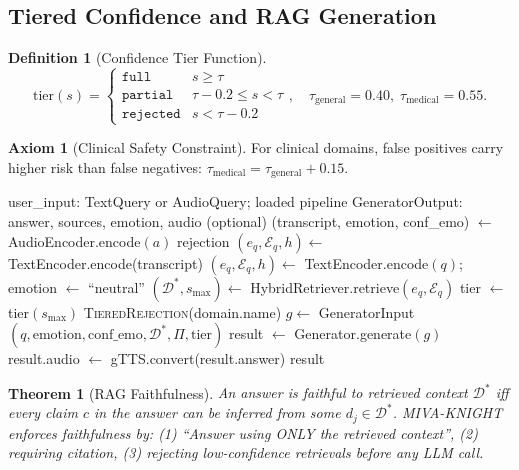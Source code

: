 \documentclass[12pt,a4paper]{article}
\theoremstyle{definition}
\newtheorem{definition}{Definition}[section]
\newtheorem{axiom}{Axiom}[section]
\theoremstyle{plain}
\newtheorem{theorem}{Theorem}[section]
\theoremstyle{remark}
\begin{document}
\subsection{Tiered Confidence and RAG Generation}

\begin{definition}[Confidence Tier Function]
\[
  \text{tier}(s) = \begin{cases}
    \texttt{full}     & s \ge \tau \\
    \texttt{partial}  & \tau - 0.2 \le s < \tau \\
    \texttt{rejected} & s < \tau - 0.2
  \end{cases}, \quad
  \tau_{\text{general}} = 0.40,\; \tau_{\text{medical}} = 0.55.
\]
\end{definition}

\begin{axiom}[Clinical Safety Constraint]
For clinical domains, false positives carry higher risk than false negatives:
$\tau_{\text{medical}} = \tau_{\text{general}} + 0.15$.
\end{axiom}

\begin{algorithm}[H]
\caption{Full Query Pipeline (MIVA-KNIGHT Inference)}
\label{alg:query}
\begin{algorithmic}[1]
\Require user\_input: TextQuery or AudioQuery; loaded pipeline
\Ensure GeneratorOutput: answer, sources, emotion, audio (optional)
  \State (transcript, emotion, conf\_emo) $\gets$ AudioEncoder.encode$(a)$
   \Return rejection \EndIf
  \State $(e_q, \mathcal{E}_q, h) \gets$ TextEncoder.encode(transcript)
\Else
  \State $(e_q, \mathcal{E}_q, h) \gets$ TextEncoder.encode$(q)$; emotion $\gets$ ``neutral''
\EndIf
{}  \EndIf
\State $(\mathcal{D}^*, s_{\max}) \gets$ HybridRetriever.retrieve$(e_q, \mathcal{E}_q)$
\State tier $\gets$ tier$(s_{\max})$
 \Return \textsc{TieredRejection}(domain.name) \EndIf
\State $g \gets$ GeneratorInput$(q, \text{emotion}, \text{conf\_emo}, \mathcal{D}^*, \Pi, \text{tier})$
\State result $\gets$ Generator.generate$(g)$
 result.audio $\gets$ gTTS.convert(result.answer) \EndIf
\State \Return result
\end{algorithmic}
\end{algorithm}

\begin{theorem}[RAG Faithfulness]
An answer is \emph{faithful} to retrieved context $\mathcal{D}^*$ iff every claim $c$ in the answer can be inferred from some $d_j \in \mathcal{D}^*$. MIVA-KNIGHT enforces faithfulness by: (1) ``Answer using ONLY the retrieved context'', (2) requiring citation, (3) rejecting low-confidence retrievals before any LLM call.
\end{theorem}
\end{document}
